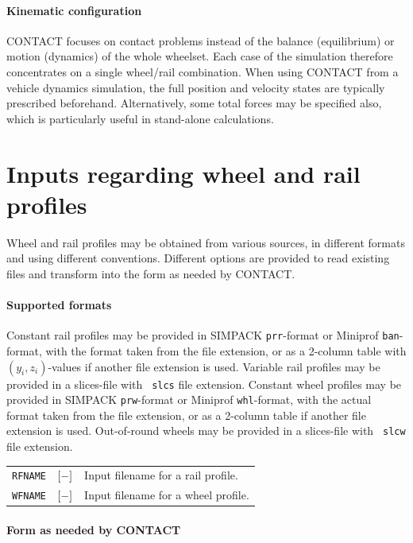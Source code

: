 \documentclass[12pt]{report}
\newenvironment{inputvars}{\vspace{0.4\baselineskip}%

\begin{tabular}{>{\raggedright}p{22mm}p{19mm}p{113mm}}}{
\end{tabular}

}
\newcommand{\inpvar}[3]{{\small\tt #1} & $#2$ & #3 \\[1ex]}
\begin{document}
\paragraph{Kinematic configuration}

CONTACT focuses on contact problems instead of the balance (equilibrium)
or motion (dynamics) of the whole wheelset. Each case of the simulation
therefore concentrates on a single wheel/rail combination. When using
CONTACT from a vehicle dynamics simulation, the full position and velocity
states are typically prescribed beforehand. Alternatively, some
total forces may be specified also, which is particularly useful in
stand-alone calculations.

\section{Inputs regarding wheel and rail profiles}
\label{sec:profiles}

Wheel and rail profiles may be obtained from various sources, in different
formats and using different conventions. Different options are provided
to read existing files and transform into the form as needed by CONTACT.

\paragraph{Supported formats}

Constant rail profiles may be provided in SIMPACK {\tt prr}-format or
Miniprof {\tt ban}-format, with the format taken from the file extension,
or as a 2-column table with $(y_i,z_i)$-values if another file extension is
used. Variable rail profiles may be provided in a slices-file with {\tt
slcs} file extension. Constant wheel profiles may be provided in SIMPACK
{\tt prw}-format or Miniprof {\tt whl}-format, with the actual format taken
from the file extension, or as a 2-column table if another file extension
is used. Out-of-round wheels may be provided in a slices-file with {\tt
slcw} file extension.
\begin{inputvars}
\inpvar{RFNAME}{\bunit{-}}{Input filename for a rail profile.}
\inpvar{WFNAME}{\bunit{-}}{Input filename for a wheel profile.}
\end{inputvars}

\paragraph{Form as needed by CONTACT}
\end{document}
